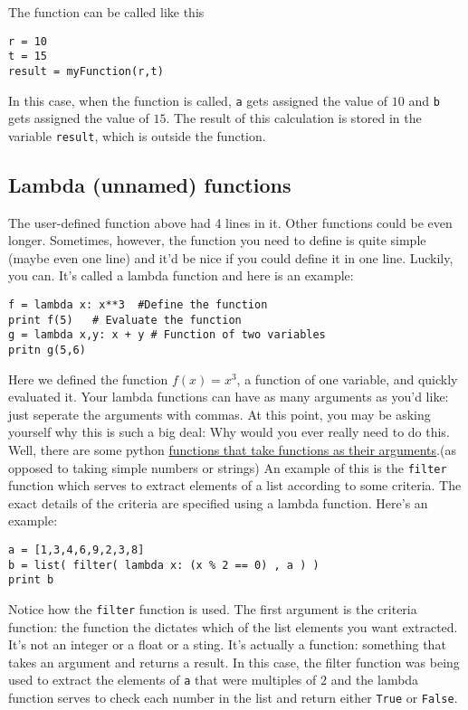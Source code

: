 The function can be called like this
\begin{Verbatim}
r = 10
t = 15
result = myFunction(r,t)
\end{Verbatim}
In this case, when the function is called, \texttt{a} gets assigned
the value of $10$ and \texttt{b} gets assigned the value of $15$.  The
result of this calculation is stored in the variable \texttt{result},
which is outside the function.  
\subsection*{Lambda (unnamed) functions}
The user-defined function above had 4 lines in it.  Other functions
could be even longer.  Sometimes, however, the function you need to
define is quite simple (maybe even one line) and it'd be nice if you
could define it in one line.  Luckily, you can.  It's
called a lambda function and here is an example:
\begin{Verbatim}
f = lambda x: x**3  #Define the function
print f(5)   # Evaluate the function
g = lambda x,y: x + y # Function of two variables
pritn g(5,6)
\end{Verbatim}
Here we defined the function $f(x) = x^3$, a function of one variable,
and quickly evaluated it.  Your lambda functions can have as many
arguments as you'd like: just seperate the arguments with commas.  At
this point, you may be asking yourself why this is such a big deal:
Why would you ever really need to do this.  Well, there are some
python \underline{functions that take functions as their
  arguments}.(as opposed
to taking simple numbers or strings) An example of this is the
\texttt{filter} function which serves to extract elements of a list
according to some criteria.  The exact details of the criteria are
specified using a lambda function.  Here's an example:
\begin{Verbatim}
a = [1,3,4,6,9,2,3,8]
b = list( filter( lambda x: (x % 2 == 0) , a ) )
print b
\end{Verbatim}
Notice how the \texttt{filter} function is used.  The first argument
is the criteria function: the function the dictates which of the list
elements you want extracted. It's not an integer or a float or a
sting.  It's actually a function: something that takes an argument and
returns a result.  In this case, the filter function was being used to
extract the elements of \texttt{a} that were multiples of $2$ and the
lambda function serves to check each number in the list and return
either \texttt{True} or \texttt{False}.

